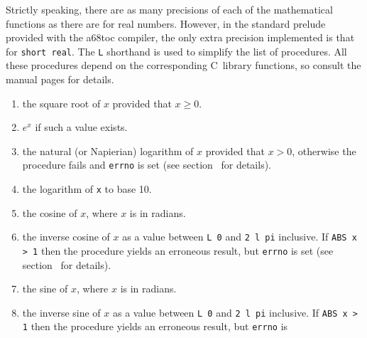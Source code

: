 Strictly speaking, there are as many precisions of each of the
mathematical functions as there are for real numbers. However, in the
standard prelude provided with the a68toc compiler, the only extra
precision implemented is that for \verb|short real|. The \verb|L|
shorthand is used to simplify the list of procedures. All these
procedures depend on the corresponding C~library functions, so consult
the manual pages for details.
\begin{enumerate}
\item {} \newline
{} the square root of $x$ provided that $x\geq0$.
\item {} \newline
{} $e^x$ if such a value exists.
\item {} \newline
{} the natural (or Napierian) logarithm of $x$
provided that $x>0$, otherwise the procedure fails and \verb|errno|
is set (see section~ for details).
\item {} \newline
{} the logarithm of \verb|x| to base 10.
\item {} \newline
{} the cosine of $x$, where $x$ is in radians.
\item {}
\newline
{} the inverse cosine of $x$ as a value
between \verb|L 0| and \verb|2 l pi| inclusive. If \verb|ABS x > 1|
then the procedure yields an erroneous result, but \verb|errno| is
set (see section~ for details).
\item {}
\newline
{} the sine of $x$, where $x$ is in radians.
\item {}
\newline
{} the inverse sine of $x$ as a value
between \verb|L 0| and \verb|2 l pi| inclusive. If \verb|ABS x > 1|
then the procedure yields an erroneous result, but \verb|errno| is

\end{enumerate}
